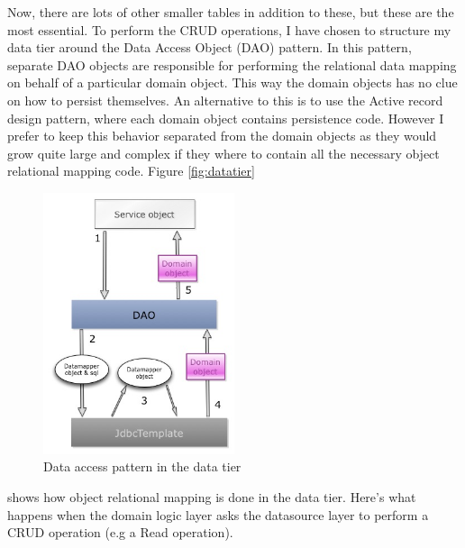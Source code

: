 Now, there are lots of other smaller tables in addition to these, but these are the most essential. To perform the CRUD operations, I have chosen to structure my data tier around the Data Access Object (DAO) pattern. In this pattern, separate DAO objects are responsible for performing the relational data mapping on behalf of a particular domain object. This way the domain objects has no clue on how to persist themselves. An alternative to this is to use the Active record design pattern, where each domain object contains persistence code. However I prefer to keep this behavior separated from the domain objects as they would grow quite large and complex if they where to contain all the necessary object relational mapping code. Figure \vref{fig:datatier}
	\begin{figure}
	  \begin{center}
	    \includegraphics[width=0.5\textwidth]{images/datatier.jpg}
	  \end{center}
	  \caption{Data access pattern in the data tier}  \label{fig:datatier}
	\end{figure} 
	shows how object relational mapping is done in the data tier. Here's what happens when the domain logic layer asks the datasource layer to perform a CRUD operation (e.g a Read operation).
		
